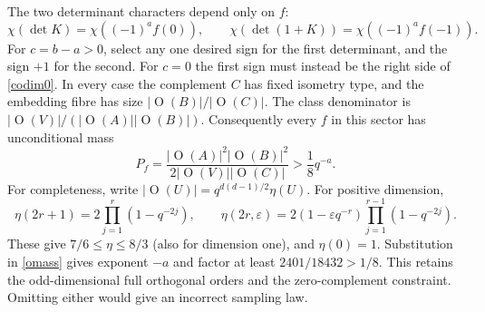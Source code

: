 \documentclass[11pt]{article}
\newcommand{\Or}{\operatorname O}
\newcommand{\eps}{\varepsilon}
\begin{document}
The two determinant characters depend only on $f$:
\[
\chi(\det K)=\chi((-1)^af(0)),\qquad
\chi(\det(1+K))=\chi((-1)^af(-1)).
\]
For $c=b-a>0$, select any one desired sign for the first determinant, and the sign $+1$ for the second. For $c=0$ the first sign must instead be the right side of \eqref{codim0}. In every case the complement $C$ has fixed isometry type, and the embedding fibre has size $|\Or(B)|/|\Or(C)|$. The class denominator is $|\Or(V)|/(|\Or(A)||\Or(B)|)$. Consequently every $f$ in this sector has unconditional mass
\begin{equation}\label{omass}
P_f=\frac{|\Or(A)|^2|\Or(B)|^2}{2|\Or(V)||\Or(C)|}>\frac18q^{-a}.
\end{equation}
For completeness, write $|\Or(U)|=q^{d(d-1)/2}\eta(U)$. For positive dimension,
\[
\eta(2r+1)=2\prod_{j=1}^r(1-q^{-2j}),\qquad
\eta(2r,\eps)=2(1-\eps q^{-r})\prod_{j=1}^{r-1}(1-q^{-2j}).
\]
These give $7/6\le\eta\le8/3$ (also for dimension one), and $\eta(0)=1$. Substitution in \eqref{omass} gives exponent $-a$ and factor at least $2401/18432>1/8$. This retains the odd-dimensional full orthogonal orders and the zero-complement constraint. Omitting either would give an incorrect sampling law.
\end{document}
